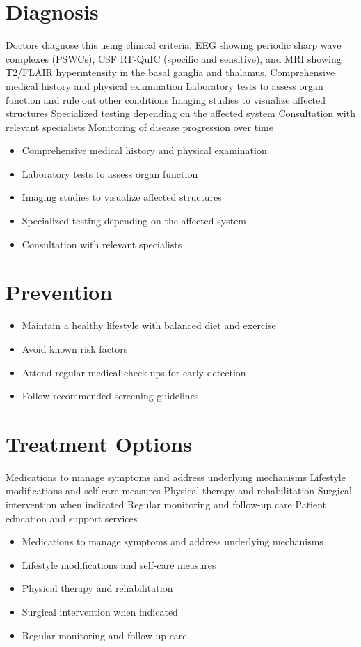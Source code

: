 \section{Diagnosis}
Doctors diagnose this using clinical criteria, EEG showing periodic sharp wave complexes (PSWCs), CSF RT-QuIC (specific and sensitive), and MRI showing T2/FLAIR hyperintensity in the basal ganglia and thalamus. Comprehensive medical history and physical examination Laboratory tests to assess organ function and rule out other conditions Imaging studies to visualize affected structures Specialized testing depending on the affected system Consultation with relevant specialists Monitoring of disease progression over time

\begin{itemize}[noitemsep]
  \item Comprehensive medical history and physical examination
  \item Laboratory tests to assess organ function
  \item Imaging studies to visualize affected structures
  \item Specialized testing depending on the affected system
  \item Consultation with relevant specialists
\end{itemize}
\section{Prevention}
\begin{itemize}[noitemsep]
  \item Maintain a healthy lifestyle with balanced diet and exercise
  \item Avoid known risk factors
  \item Attend regular medical check-ups for early detection
  \item Follow recommended screening guidelines
\end{itemize}
\section{Treatment Options}
Medications to manage symptoms and address underlying mechanisms Lifestyle modifications and self-care measures Physical therapy and rehabilitation Surgical intervention when indicated Regular monitoring and follow-up care Patient education and support services

\begin{itemize}[noitemsep]
  \item Medications to manage symptoms and address underlying mechanisms
  \item Lifestyle modifications and self-care measures
  \item Physical therapy and rehabilitation
  \item Surgical intervention when indicated
  \item Regular monitoring and follow-up care
\end{itemize}
